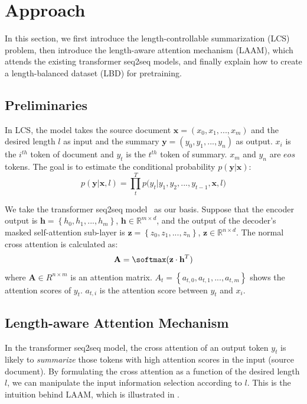 \section{Approach}
\label{sec:approach}
In this section, 
we first introduce the length-controllable summarization (LCS) problem,
then introduce the length-aware attention mechanism (LAAM), 
which attends the existing transformer seq2seq models, 
and finally explain how to create a length-balanced dataset (LBD) for pretraining. 

\subsection{Preliminaries}
In LCS, the model takes the source document 
$\mathbf{x} = (x_{0},x_{1},...,x_{m})$ and the desired length $l$ as input and the summary $\mathbf{y} = (y_{0},y_{1},..., y_{n})$ as output. 
$x_i$ is the $i^{th}$ token of document and
$y_t$ is the $t^{th}$ token of summary.
$x_{m}$ and $y_{n}$ are $eos$ tokens.
The goal is to estimate the conditional probability
$p(\mathbf{y}|\mathbf{x})$:
\begin{equation}
	p(\mathbf{y} | \mathbf{x},l) \!=\! {\prod^T_{t} {p(y_{t} | y_{1}, y_{2},..., y_{t-1}, \mathbf{x},l})}
\end{equation}

 
We take the transformer seq2seq model~\cite{attn17} as our basis.
Suppose that the encoder output is $\mathbf{h}=\left\{h_0,h_1,...,h_m\right\}$,  
$\mathbf{h} \in \mathbb{R}^{m \times d}$,
and the output of the decoder's masked self-attention sub-layer 
is $\mathbf{z}=\left\{z_0,z_1,...,z_n\right\}$,
$\mathbf{z} \in \mathbb{R}^{n \times d}$.
The normal cross attention is calculated as:
\begin{equation}
	\mathbf{A}=\softmax(\textbf{z} \cdot \textbf{h}^T)
\end{equation}
where $\mathbf{A} \in R^{n\times m}$ is an attention matrix.
$A_{t}=\left\{a_{t,0}, a_{t,1},...,a_{t,m}\right\}$ shows the attention scores of $y_t$. 
$a_{t,i}$ is the attention score between $y_t$ and $x_i$.

\subsection{Length-aware Attention Mechanism}
\label{sec:model} 
In the transformer seq2seq model, the cross attention of
an output token $y_t$ is likely to \textit{summarize}
those tokens with high attention scores in the input (source document).
By formulating the cross attention as a function of
the desired length $l$, we can manipulate the input
information selection according to $l$. 
This is the intuition behind LAAM,
which is illustrated in .
 
